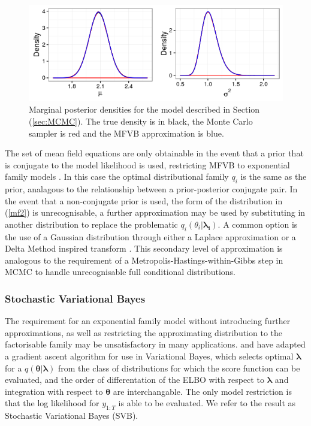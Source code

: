 \documentclass[12pt,a4paper]{article}%
\numberwithin{equation}{section}
\begin{document}
\begin{figure}[h]
\centering
\includegraphics[width=0.7\linewidth,height=\textheight,keepaspectratio]{norminvg}
\caption{Marginal posterior densities for the model described in Section (\ref{sec:MCMC}). The true density is in black, the Monte Carlo sampler is red and the MFVB approximation is blue.}
\label{fig:norminvg}
\end{figure}

The set of mean field equations are only obtainable in the event that a prior that is conjugate to the model likelihood is used, restricting MFVB to exponential family models \citep{Beal2003}. In this case the optimal distributional family $q_i$ is the same as the prior, analagous to the relationship between a prior-posterior conjugate pair. 
In the event that a non-conjugate prior is used, the form of the distribution in (\ref{mf2}) is unrecognisable, a further approximation may be used by substituting in another distribution to replace the problematic $q_i(\theta_i |\boldsymbol{\lambda_i}).$ A common option is the use of a Gaussian distribution through either a Laplace approximation \citep{Friston2006} or a Delta Method inspired transform \citep{Wang2013}. This secondary level of approximation is analogous to the requirement of a Metropolis-Hastings-within-Gibbs step in MCMC to handle unrecognisable full conditional distributions.

\subsubsection{Stochastic Variational Bayes}

The requirement for an exponential family model without introducing further approximations, as well as restricting the approximating distribution to the factorisable family may be unsatisfactory in many applications. \citet{Paisley2012} and \citet{Ranganath2014} have adapted a gradient ascent algorithm for use in Variational Bayes, which selects optimal $\boldsymbol{\lambda}$ for a $q(\boldsymbol{\theta} | \boldsymbol{\lambda})$ from the class of distributions for which the score function can be evaluated, and the order of differentation of the ELBO with respect to $\boldsymbol{\lambda}$ and integration with respect to $\boldsymbol{\theta}$ are interchangable. The only model restriction is that the log likelihood for $y_{1:T}$ is able to be evaluated. We refer to the result as Stochastic Variational Bayes (SVB).
\end{document}

